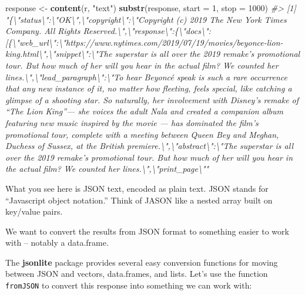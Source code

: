 \documentclass[]{book}
\newenvironment{Shaded}{\begin{snugshade}}{\end{snugshade}}
\newcommand{\KeywordTok}[1]{\textcolor[rgb]{0.13,0.29,0.53}{\textbf{#1}}}
\newcommand{\DataTypeTok}[1]{\textcolor[rgb]{0.13,0.29,0.53}{#1}}
\newcommand{\DecValTok}[1]{\textcolor[rgb]{0.00,0.00,0.81}{#1}}
\newcommand{\StringTok}[1]{\textcolor[rgb]{0.31,0.60,0.02}{#1}}
\newcommand{\CommentTok}[1]{\textcolor[rgb]{0.56,0.35,0.01}{\textit{#1}}}
\newcommand{\NormalTok}[1]{#1}
\begin{document}
\begin{Shaded}
\begin{Highlighting}[]
\NormalTok{response <-}\StringTok{ }\KeywordTok{content}\NormalTok{(r, }\StringTok{"text"}\NormalTok{)}
\KeywordTok{substr}\NormalTok{(response, }\DataTypeTok{start =} \DecValTok{1}\NormalTok{, }\DataTypeTok{stop =} \DecValTok{1000}\NormalTok{)}
\CommentTok{#> [1] "\{\textbackslash{}"status\textbackslash{}":\textbackslash{}"OK\textbackslash{}",\textbackslash{}"copyright\textbackslash{}":\textbackslash{}"Copyright (c) 2019 The New York Times Company. All Rights Reserved.\textbackslash{}",\textbackslash{}"response\textbackslash{}":\{\textbackslash{}"docs\textbackslash{}":[\{\textbackslash{}"web_url\textbackslash{}":\textbackslash{}"https://www.nytimes.com/2019/07/19/movies/beyonce-lion-king.html\textbackslash{}",\textbackslash{}"snippet\textbackslash{}":\textbackslash{}"The superstar is all over the 2019 remake’s promotional tour. But how much of her will you hear in the actual film? We counted her lines.\textbackslash{}",\textbackslash{}"lead_paragraph\textbackslash{}":\textbackslash{}"To hear Beyoncé speak is such a rare occurrence that any new instance of it, no matter how fleeting, feels special, like catching a glimpse of a shooting star. So naturally, her involvement with Disney’s remake of “The Lion King”— she voices the adult Nala and created a companion album featuring new music inspired by the movie — has dominated the film’s promotional tour, complete with a meeting between Queen Bey and Meghan, Duchess of Sussex,  at the British premiere.\textbackslash{}",\textbackslash{}"abstract\textbackslash{}":\textbackslash{}"The superstar is all over the 2019 remake’s promotional tour. But how much of her will you hear in the actual film? We counted her lines.\textbackslash{}",\textbackslash{}"print_page\textbackslash{}""}
\end{Highlighting}
\end{Shaded}

What you see here is JSON text, encoded as plain text. JSON stands for
``Javascript object notation.'' Think of JASON like a nested array built
on key/value pairs.

We want to convert the results from JSON format to something easier to
work with -- notably a data.frame.

The \textbf{jsonlite} package provides several easy conversion functions
for moving between JSON and vectors, data.frames, and lists. Let's use
the function \texttt{fromJSON} to convert this response into something
we can work with:
\end{document}
